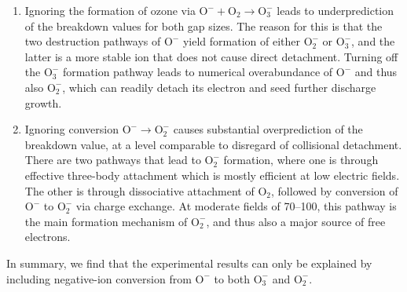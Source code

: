 \documentclass{iopjournal}
\newcommand{\e}{\ensuremath{\text{e}}}
\providecommand\Otwo{\ensuremath{\textrm{O}_2}}
\providecommand\Otwom{\ensuremath{\textrm{O}_2^-}}
\providecommand\Othreem{\ensuremath{\textrm{O}_3^-}}
\providecommand\Ominus{\ensuremath{\textrm{O}^-}}
\begin{document}
\begin{enumerate}
\item  Ignoring the formation of ozone via $\Ominus + \Otwo \rightarrow \Othreem$ leads to underprediction of the breakdown values for both gap sizes.
  The reason for this is that the two destruction pathways of $\Ominus$ yield formation of either $\Otwom$ or $\Othreem$, and the latter is a more stable ion that does not cause direct detachment.
  Turning off the $\Othreem$ formation pathway leads to numerical overabundance of $\Ominus$ and thus also $\Otwom$, which can readily detach its electron and seed further discharge growth.
\item Ignoring conversion $\Ominus\rightarrow\Otwom$ causes substantial overprediction of the breakdown value, at a level comparable to disregard of collisional detachment.
  There are two pathways that lead to $\Otwom$ formation, where one is through effective three-body attachment which is mostly efficient at low electric fields.
  The other is through dissociative attachment of $\Otwo$, followed by conversion of $\Ominus$ to $\Otwom$ via charge exchange.
  At moderate fields of \SIrange{70}{100}{\townsend}, this pathway is the main formation mechanism of $\Otwom$, and thus also a major source of free electrons.
\end{enumerate}
In summary, we find that the experimental results can only be explained by including negative-ion conversion from $\Ominus$ to both $\Othreem$ and $\Otwom$.
\end{document}
